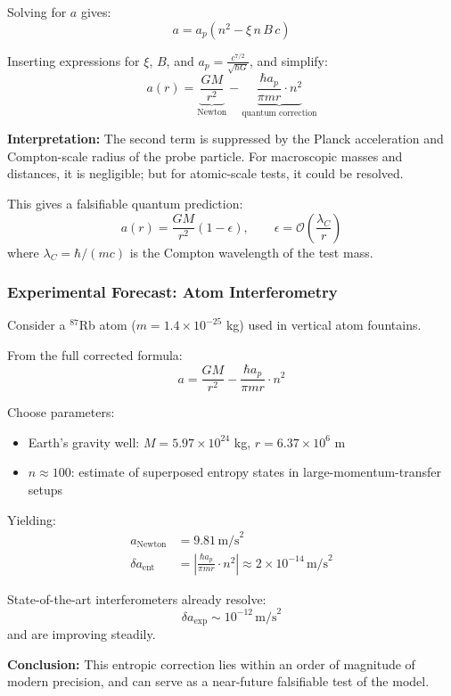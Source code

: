 \documentclass[12pt]{article}
\begin{document}
Solving for $a$ gives:
\[
a = a_p \left( n^2 - \xi\, n\, B\, c \right)
\]

Inserting expressions for $\xi$, $B$, and $a_p = \frac{c^{7/2}}{\sqrt{\hbar G}}$, and simplify:
\[
a(r) = \underbrace{\frac{G M}{r^2}}_{\text{Newton}} - \underbrace{\frac{\hbar a_p}{\pi m r} \cdot n^2}_{\text{quantum correction}}
\]

\noindent
\textbf{Interpretation:} The second term is suppressed by the Planck acceleration and Compton-scale radius of the probe particle. For macroscopic masses and distances, it is negligible; but for atomic-scale tests, it could be resolved.

This gives a falsifiable quantum prediction:
\[
a(r) = \frac{G M}{r^2} \left( 1 - \epsilon \right), \qquad
\epsilon = \mathcal{O}\left( \frac{\lambda_C}{r} \right)
\]
where \( \lambda_C = \hbar/(m c) \) is the Compton wavelength of the test mass.

\subsubsection*{Experimental Forecast: Atom Interferometry}

Consider a $^{87}$Rb atom ($m = 1.4 \times 10^{-25}$ kg) used in vertical atom fountains.

From the full corrected formula:
\[
a = \frac{G M}{r^2} - \frac{\hbar a_p}{\pi m r} \cdot n^2
\]

Choose parameters:
\begin{itemize}
    \item Earth's gravity well: $M = 5.97 \times 10^{24}$ kg, $r = 6.37 \times 10^6$ m
    \item $n \approx 100$: estimate of superposed entropy states in large-momentum-transfer setups
\end{itemize}

Yielding:
\begin{align*}
a_{\text{Newton}} &= 9.81 \, \text{m/s}^2 \\
\delta a_{\text{ent}} &= \left| \frac{\hbar a_p}{\pi m r} \cdot n^2 \right| \approx 2 \times 10^{-14} \, \text{m/s}^2
\end{align*}

State-of-the-art interferometers already resolve:
\[
\delta a_{\text{exp}} \sim 10^{-12} \, \text{m/s}^2
\]
and are improving steadily.

\noindent
\textbf{Conclusion:} This entropic correction lies within an order of magnitude of modern precision, and can serve as a near-future falsifiable test of the model.
\end{document}
